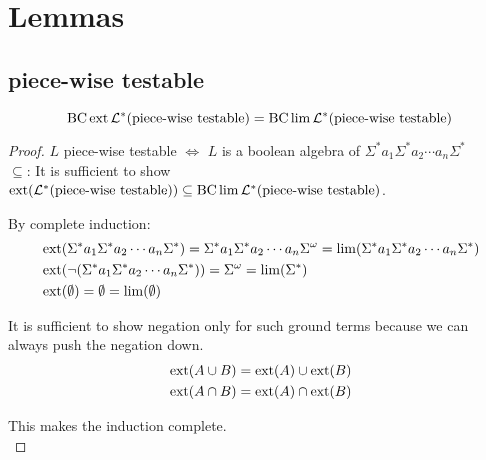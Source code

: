 \section{Lemmas}

\subsection{piece-wise testable}

\begin{thm}
\[ \operatorname{BC} \operatorname{ext} \mathcal{L}^* (\textup{\textrm{piece-wise testable}}) = \operatorname{BC} \lim \mathcal{L}^* (\textup{\textrm{piece-wise testable}}) \]
\end{thm}

\begin{proof}

$L$ piece-wise testable $\Leftrightarrow$ $L$ is a boolean algebra of $\Sigma^* a_1 \Sigma^* a_2 \dotsb a_n \Sigma^*$
\\

$\subseteq$: It is sufficient to show $\operatorname{ext}(\mathcal{L}^* (\textup{\textrm{piece-wise testable}})) \subseteq \operatorname{BC} \lim \mathcal{L}^* (\textup{\textrm{piece-wise testable}})$.

By complete induction:
\begin{align*}
& \operatorname{ext}(\Sigma^* a_1 \Sigma^* a_2 \dotsb a_n \Sigma^*) = \Sigma^* a_1 \Sigma^* a_2 \dotsb a_n \Sigma^\omega = \lim(\Sigma^* a_1 \Sigma^* a_2 \dotsb a_n \Sigma^*) \\
& \operatorname{ext}( \neg ( \Sigma^* a_1 \Sigma^* a_2 \dotsb a_n \Sigma^* )) = \Sigma^\omega = \lim( \Sigma^* ) \\
& \operatorname{ext}( \emptyset ) = \emptyset = \lim(\emptyset)
\end{align*}

It is sufficient to show negation only for such ground terms because we can always push the negation down.
\begin{align*}
& \operatorname{ext}(A \cup B) = \operatorname{ext}(A) \cup \operatorname{ext}(B) \\
& \operatorname{ext}(A \cap B) = \operatorname{ext}(A) \cap \operatorname{ext}(B)
\end{align*}

This makes the induction complete.
\\


\end{proof}
